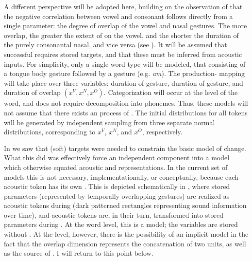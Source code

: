 A different perspective will be adopted here, building on the observation
of \citet{Beddor2009} that the negative correlation between vowel
 and consonant  follows directly from a single 
parameter: the degree of overlap of the vowel and nasal gestures.
The more overlap, the greater the extent of  on the vowel,
and the shorter the duration of the purely consonantal nasal, and
vice versa (see ). It will be assumed
that successful  requires stored  targets, and
that these must be inferred from acoustic inputs. For simplicity,
only a single word type will be modeled, that consisting of a tongue
body gesture followed by a  gesture (e.g. \textit{am}). The production-
mapping will take place over three  variables: duration of
 gesture, duration of  gesture, and duration of 
overlap $(x^{V},x^{N},x^{O})$. Categorization will occur at the level
of the word, and does not require decomposition into phonemes. Thus,
these models will not assume that there exists an  process
of . The initial distributions for all tokens will
be generated by independent sampling from three separate normal distributions,
corresponding to $x^{V}$, $x^{N}$, and $x^{O}$, respectively. 

In  we saw that (soft) targets\largerpage
were needed to constrain the basic  model of change. What
this did was effectively force an independent  component
into a model which otherwise equated acoustic and  representations.
In the current set of models this is not necessary, implementationally,
or conceptually, because each acoustic token has its own 
. This is depicted schematically in ,
where stored  parameters (represented by temporally overlapping
 gestures) are realized as acoustic tokens during 
(dark patterned rectangles representing sound  information
over time), and acoustic tokens are, in their turn, transformed into
stored  parameters during . At the word level,
this is a  model; the  variables are stored
without . At the  level, however, there is the
possibility of an implicit  model in the fact that the
overlap dimension represents the concatenation of two units, as well
as the source of . I will return to this point below.

